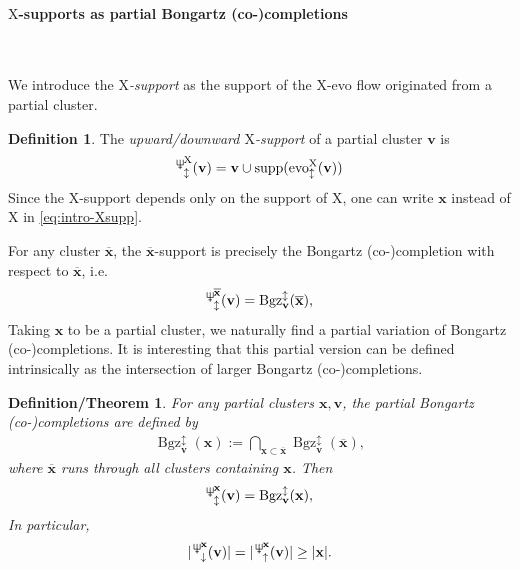 \documentclass[11pt,reqno]{amsart}
\newcommand{\Neptune}{\mathord{\text{\tikz[baseline=-.5ex,scale=.13]{\draw[line width=.45pt] (0,0)--(0,1.8) (-.6,1.8)--(-.6,.8)--(.6,.8)--(.6,1.8) (-.35,.35)--(.35,.35);}}}}
\theoremstyle{plain}
\newtheorem{thmdef}[theorem]{Definition/Theorem}
\theoremstyle{definition}
\newtheorem{definition}[theorem]{Definition}
\numberwithin{equation}{section}
\newcommand\<{\langle}
\renewcommand\>{\rangle}
\newcommand{\on}[1]{\operatorname{#1}}
\def\vv{\mathbf{v}}
\def\sink{X}
\newcommand{\flowd}[1]{\on{evo}^{#1}_{\downarrow}}
\newcommand{\flowu}[1]{\on{evo}^{#1}_{\uparrow}}
\newcommand{\flowdu}[1]{\on{evo}_{\updownarrow}^{#1}}
\newcommand{\flowDU}[1]{\on{Evo}_{\updownarrow}^{#1}}
\newcommand{\ccpt}[1]{\mathrm{#1}}%
\def\xevo{\ccpt{X}}%
\def\xx{\mathbf{x}}%
\def\supp{\on{supp}}
\newcommand{\Bgzm}[2]{\operatorname{Bgz}^{\downarrow}_{#2}(#1)}
\newcommand{\Bgzpm}[2]{\operatorname{Bgz}^{\updownarrow}_{#2}(#1)}
\newcommand{\suppd}[1]{\operatorname{\Neptune}_{\downarrow}^{#1}}
\newcommand{\suppu}[1]{\operatorname{\Neptune}_{\uparrow}^{#1}}
\newcommand{\suppdu}[1]{\operatorname{\Neptune}_{\updownarrow}^{#1}}
\newcommand{\ol}[1]{\overline{#1}}
\begin{document}
\paragraph{\textbf{$\xevo$-supports as partial Bongartz (co-)completions}}\

We introduce the \emph{$\xevo$-support} 
as the support of the $\xevo$-evo flow originated from a partial cluster.

\begin{definition}
    The \emph{upward/downward $\xevo$-support} of a partial cluster $\vv$ is
    \begin{gather}\label{eq:intro-Xsupp}
        \suppdu{\xevo}(\vv)
        =\vv\cup\supp(\flowdu{\xevo}(\vv))
    \end{gather}
    Since the $\xevo$-support depends only on the support of $\xevo$, one can write $\xx$ instead of $\xevo$ in \eqref{eq:intro-Xsupp}.
\end{definition}
For any cluster $\ol{\xx}$, the $\ol{\xx}$-support is precisely the Bongartz (co-)completion with respect to $\ol{\xx}$, i.e.
\begin{gather}\label{eq:intro-supp=Bgz}
    \suppdu{\ol{\xx}}(\vv)=\Bgzpm{\ol{\xx}}{\vv},
\end{gather}
Taking $\xx$ to be a partial cluster, we naturally find a partial variation of Bongartz (co-)completions. 
It is interesting that this partial version can be defined intrinsically as the intersection of larger Bongartz (co-)completions.
\begin{thmdef}\label{thm:intro-supp=Bgz}
    For any partial clusters $\xx,\vv$, the \emph{partial Bongartz (co-)completions} are defined by
    \begin{gather}
        \Bgzpm{\xx}{\vv}:=\bigcap_{\xx\subset\ol{\xx}}\Bgzpm{\ol{\xx}}{\vv},
    \end{gather}
    where $\ol{\xx}$ runs through all clusters containing $\xx$. Then
    \begin{gather}
        \suppdu{\xx}(\vv)=\Bgzpm{\xx}{\vv},
    \end{gather}
    In particular,
    \begin{gather}
        |\suppd{\xx}(\vv)|=|\suppu{\xx}(\vv)|\ge|\xx|.
    \end{gather}
\end{thmdef}
\end{document}
